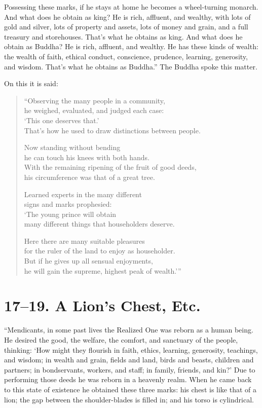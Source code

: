\documentclass[12pt,openany]{book}%
\begin{document}
Possessing these marks, if he stays at home he becomes a wheel-turning monarch. And what does he obtain as king? He is rich, affluent, and wealthy, with lots of gold and silver, lots of property and assets, lots of money and grain, and a full treasury and storehouses. That’s what he obtains as king. And what does he obtain as Buddha? He is rich, affluent, and wealthy. He has these kinds of wealth: the wealth of faith, ethical conduct, conscience, prudence, learning, generosity, and wisdom. That’s what he obtains as Buddha.” The Buddha spoke this matter. 

On this it is said: 

\begin{verse}%
“Observing the many people in a community, \\
he weighed, evaluated, and judged each case: \\
‘This one deserves that.’ \\
That’s how he used to draw distinctions between people. 

Now standing without bending \\
he can touch his knees with both hands. \\
With the remaining ripening of the fruit of good deeds, \\
his circumference was that of a great tree. 

Learned experts in the many different \\
signs and marks prophesied: \\
‘The young prince will obtain \\
many different things that householders deserve. 

Here there are many suitable pleasures \\
for the ruler of the land to enjoy as householder. \\
But if he gives up all sensual enjoyments, \\
he will gain the supreme, highest peak of wealth.’” 

%
\end{verse}

\section*{17–19. A Lion’s Chest, Etc. }

“Mendicants, in some past lives the Realized One was reborn as a human being. He desired the good, the welfare, the comfort, and sanctuary of the people, thinking: ‘How might they flourish in faith, ethics, learning, generosity, teachings, and wisdom; in wealth and grain, fields and land, birds and beasts, children and partners; in bondservants, workers, and staff; in family, friends, and kin?’ Due to performing those deeds he was reborn in a heavenly realm. When he came back to this state of existence he obtained these three marks: his chest is like that of a lion; the gap between the shoulder-blades is filled in; and his torso is cylindrical. 
\end{document}
